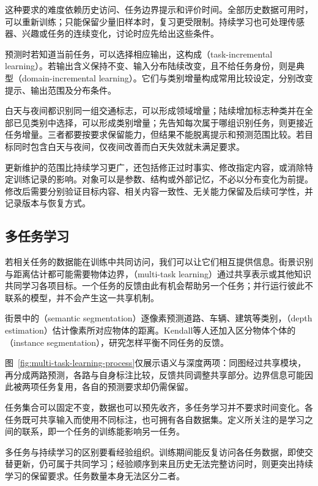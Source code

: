 这种要求的难度依赖历史访问、任务边界提示和评价时间。全部历史数据可用时，可以重新训练；只能保留少量旧样本时，复习更受限制。持续学习也可处理传感器、兴趣或任务的连续变化，讨论时应先给出这些条件。

预测时若知道当前任务，可以选择相应输出，这构成（task-incremental learning）。若输出含义保持不变、输入分布陆续改变，且不给任务身份，则是典型（domain-incremental learning）。它们与类别增量构成常用比较设定，分别改变提示、输出范围及分布条件。

白天与夜间都识别同一组交通标志，可以形成领域增量；陆续增加标志种类并在全部已见类别中选择，可以形成类别增量；先告知每次属于哪组识别任务，则更接近任务增量。三者都要按要求保留能力，但结果不能脱离提示和预测范围比较。若目标同时包含白天与夜间，仅夜间改善而白天失效就未满足要求。

更新维护的范围比持续学习更广，还包括修正过时事实、修改指定内容，或消除特定训练记录的影响。对象可以是参数、结构或外部记忆，不必以分布变化为前提。修改后需要分别验证目标内容、相关内容一致性、无关能力保留及后续可学性，并记录版本与恢复方式。

\subsection{多任务学习}
\label{sec:multi-task-learning}

若相关任务的数据能在训练中共同访问，我们可以让它们相互提供信息。街景识别与距离估计都可能需要物体边界，（multi-task learning）通过共享表示或其他知识共同学习各项目标。一个任务的反馈由此有机会帮助另一个任务；并行运行彼此不联系的模型，并不会产生这一共享机制。

街景中的（semantic segmentation）逐像素预测道路、车辆、建筑等类别，（depth estimation）估计像素所对应物体的距离。Kendall等人还加入区分物体个体的（instance segmentation），研究怎样平衡不同任务的反馈。

图~\ref{fig:multi-task-learning-process}仅展示语义与深度两项：同图经过共享模块，再分成两路预测，各路与自身标注比较，反馈共同调整共享部分。边界信息可能因此被两项任务复用，各自的预测要求却仍需保留。

任务集合可以固定不变，数据也可以预先收齐，多任务学习并不要求时间变化。各任务既可共享输入而使用不同标注，也可拥有各自数据集。定义所关注的是学习之间的联系，即一个任务的训练能影响另一任务。

多任务与持续学习的区别要看经验组织。训练期间能反复访问各任务数据，即使交替更新，仍可属于共同学习；经验顺序到来且历史无法完整访问时，则更突出持续学习的保留要求。任务数量本身无法区分二者。


